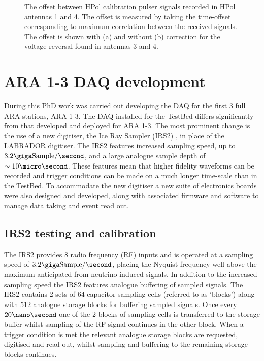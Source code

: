 \begin{figure}[htpb]
  \hfill
\caption{The offset between HPol calibration pulser signals recorded in HPol antennas 1 and 4. The offset is measured by taking the time-offset corresponding to maximum correlation between the received signals. The offset is shown with (a) and without (b) correction for the voltage reversal found in antennas 3 and 4.}
\label{fig:calibration:Voltage-Reversal-DeltaT}
\end{figure}



\section{ARA 1-3 DAQ development}
\label{sec:calibration:ARA1-3-development}

During this PhD work was carried out developing the DAQ for the first 3 full ARA stations, ARA 1-3. The DAQ installed for the TestBed differs significantly from that developed and deployed for ARA 1-3. The most prominent change is the use of a new digitiser, the Ice Ray Sampler (IRS2) \cite{IRS2}, in place of the LABRADOR digitiser. The IRS2 features increased sampling speed, up to $3.2 \giga \mbox{Sample}/\second$, and a large analogue sample depth of $\sim 10 \micro \second$. These features mean that higher fidelity waveforms can be recorded and trigger conditions can be made on a much longer time-scale than in the TestBed. To accommodate the new digitiser a new suite of electronics boards were also designed and developed, along with associated firmware and software to manage data taking and event read out.

\subsection{IRS2 testing and calibration}
\label{sec:calibration:ARA1-3-development:IRS2}

 The IRS2 provides 8 radio frequency (RF) inputs and is operated at a sampling speed of $3.2 \giga \mbox{Sample} /\second$, placing the Nyquist frequency well above the maximum anticipated from neutrino induced signals. In addition to the increased sampling speed the IRS2 features analogue buffering of sampled signals. The IRS2 contains 2 sets of 64 capacitor sampling cells (referred to as `blocks') along with 512 analogue storage blocks for buffering sampled signals. Once every $20 \nano \second$ one of the 2 blocks of sampling cells is transferred to the storage buffer whilst sampling of the RF signal continues in the other block. When a trigger condition is met the relevant analogue storage blocks are requested, digitised and read out, whilst sampling and buffering to the remaining storage blocks continues. 

